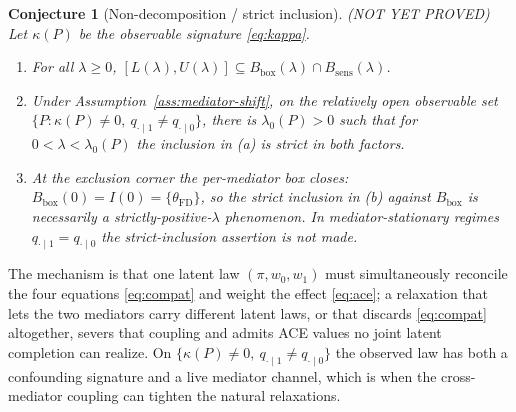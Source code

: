 \documentclass[11pt]{article}
\theoremstyle{definition}
\theoremstyle{plain}
\newtheorem{conjecture}{Conjecture}
\theoremstyle{remark}
\begin{document}
\begin{conjecture}[Non-decomposition / strict inclusion]\label{conj:nondecomp}
\textnormal{(NOT YET PROVED)} Let $\kappa(P)$ be the observable signature \eqref{eq:kappa}.
\begin{enumerate}[label=(\alph*),leftmargin=2em,itemsep=1pt]
  \item For all $\lambda\ge0$, $[L(\lambda),U(\lambda)]\subseteq B_{\mathrm{box}}(\lambda)\cap B_{\mathrm{sens}}(\lambda)$.
  \item Under Assumption~\ref{ass:mediator-shift}, on the relatively open observable set
        $\{P:\kappa(P)\neq0,\ q_{\cdot\mid1}\neq q_{\cdot\mid0}\}$, there is $\lambda_0(P)>0$ such that
        for $0<\lambda<\lambda_0(P)$ the inclusion in (a) is \emph{strict} in both factors.
  \item At the exclusion corner the per-mediator box closes:
        $B_{\mathrm{box}}(0)=I(0)=\{\theta_{\mathrm{FD}}\}$, so the strict inclusion in (b) against
        $B_{\mathrm{box}}$ is necessarily a strictly-positive-$\lambda$ phenomenon. In mediator-stationary
        regimes $q_{\cdot\mid1}=q_{\cdot\mid0}$ the strict-inclusion assertion is not made.
\end{enumerate}
\end{conjecture}
\noindent The mechanism is that one latent law $(\pi,w_0,w_1)$ must simultaneously reconcile the four
equations \eqref{eq:compat} and weight the effect \eqref{eq:ace}; a relaxation that lets the two mediators
carry different latent laws, or that discards \eqref{eq:compat} altogether, severs that coupling and admits
ACE values no joint latent completion can realize. On
$\{\kappa(P)\neq0,\ q_{\cdot\mid1}\neq q_{\cdot\mid0}\}$ the observed law has both a confounding signature
and a live mediator channel, which is when the cross-mediator coupling can tighten the natural relaxations.
\end{document}
